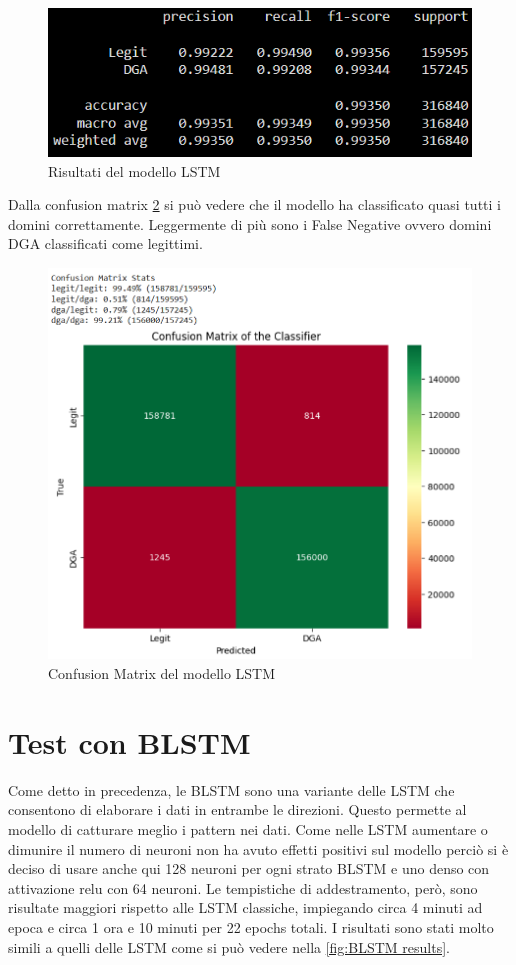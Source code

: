 \documentclass[12pt,a4paper,openright,twoside]{book}
\begin{document}
\begin{figure}[h]
    \centering
    \includegraphics[width=.8\linewidth]{figures/LSTM_results.png}
    \caption{Risultati del modello LSTM}
    \label{fig:LSTM results}
\end{figure}

\noindent Dalla confusion matrix \ref{fig:LSTM confusion matrix} si può vedere che il modello ha classificato quasi tutti 
i domini correttamente. Leggermente di più sono i
False Negative ovvero domini DGA classificati come legittimi.
\begin{figure}[H]
    \centering
    \includegraphics[width=.8\linewidth]{figures/LSTM conf_matr.png}
    \caption{Confusion Matrix del modello LSTM}
    \label{fig:LSTM confusion matrix}
\end{figure}

\section{Test con BLSTM}

Come detto in precedenza, le BLSTM sono una variante delle LSTM che
consentono di elaborare i dati in entrambe le direzioni.
Questo permette al modello di catturare meglio
i pattern nei dati.
Come nelle LSTM aumentare o dimunire il numero di neuroni
non ha avuto effetti positivi sul modello perciò si è deciso di usare anche qui
128 neuroni per ogni strato BLSTM e uno denso con attivazione relu con 64 neuroni.
Le tempistiche di addestramento, però, sono risultate
maggiori rispetto alle LSTM classiche, impiegando circa 4 minuti ad epoca e circa 1 ora e 10 minuti per 22 epochs totali.
I risultati sono stati molto simili a quelli delle LSTM come si può vedere nella \cref{fig:BLSTM results}.
\end{document}

